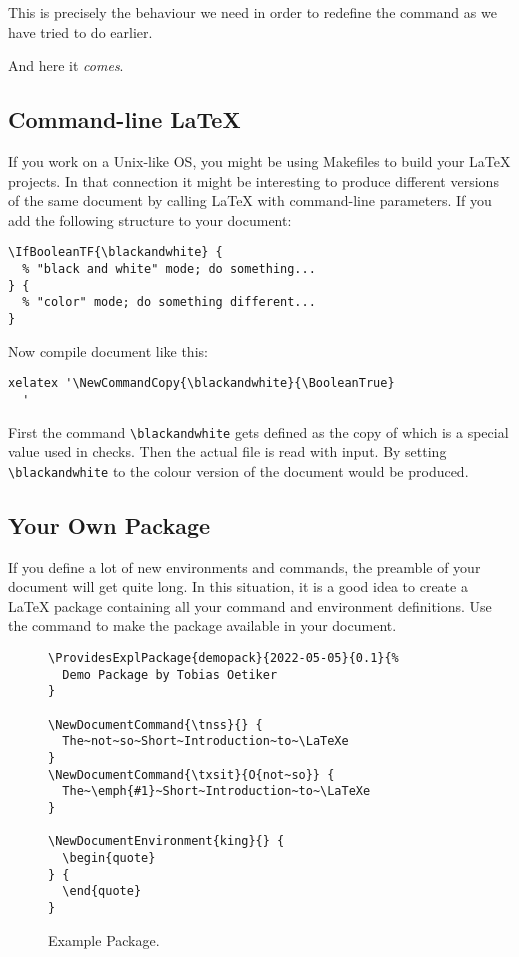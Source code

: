 This is precisely the behaviour we need in order to redefine the 
command as we have tried to do earlier.
\begin{example}[examplewidth=0.4\linewidth]
\NewCommandCopy{\oldemph}{\emph}

And here it \emph{comes}.
\end{example}

\subsection{Command-line \LaTeX}

If you work on a Unix-like OS, you might be using Makefiles to build your
\LaTeX{} projects. In that connection it might be interesting to produce
different versions of the same document by calling \LaTeX{} with command-line
parameters. If you add the following structure to your document:

\begin{verbatim}
\IfBooleanTF{\blackandwhite} {
  % "black and white" mode; do something...
} {
  % "color" mode; do something different...
}
\end{verbatim}

Now compile document like this:
\begin{verbatim}
xelatex '\NewCommandCopy{\blackandwhite}{\BooleanTrue}
  '
\end{verbatim}

First the command \verb|\blackandwhite| gets defined as the copy of
 which is a special value used in  checks. Then
the actual file is read with input. By setting \verb|\blackandwhite| to
 the colour version of the document would be produced.

\subsection{Your Own Package}

If you define a lot of new environments and commands, the preamble of
your document will get quite long. In this situation, it is a good
idea to create a \LaTeX{} package containing all your command and
environment definitions. Use the 
command to make the package available in your document.

\begin{figure}[!htbp]
\begin{lined}{\textwidth}
\begin{verbatim}
\ProvidesExplPackage{demopack}{2022-05-05}{0.1}{%
  Demo Package by Tobias Oetiker
}

\NewDocumentCommand{\tnss}{} {
  The~not~so~Short~Introduction~to~\LaTeXe
}
\NewDocumentCommand{\txsit}{O{not~so}} {
  The~\emph{#1}~Short~Introduction~to~\LaTeXe
}

\NewDocumentEnvironment{king}{} {
  \begin{quote}
} {
  \end{quote}
}
\end{verbatim}
\end{lined}
\caption{Example Package.} \label{package}
\end{figure}

